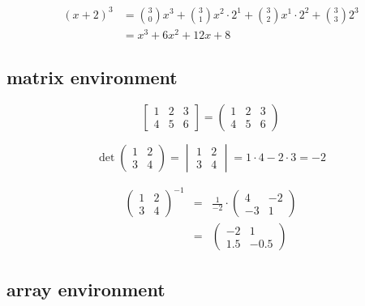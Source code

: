 \documentclass{article}
\begin{document}
\begin{align*}
(x+2)^3 &=\binom{3}{0}x^3+\binom{3}{1}x^2\cdot 2^1+\binom{3}{2}x^1\cdot 2^2+\binom{3}{3} 2^3\\[2mm] %
&= x^3+6x^2+12x+8
\end{align*}

\subsection{matrix environment}

\begin{equation}
\begin{bmatrix} %
1 & 2 & 3\\
4 & 5 & 6
\end{bmatrix}
=
\begin{pmatrix} %
1 & 2 & 3\\
4 & 5 & 6
\end{pmatrix}
\end{equation}

$$
\det 
\begin{pmatrix}
1 & 2\\
3 &4
\end{pmatrix}
=
\begin{vmatrix} %
1 & 2\\
3 &4
\end{vmatrix}
=1\cdot 4-2\cdot 3=-2
$$

\begin{eqnarray}
\begin{pmatrix}
1 & 2\\
3 &4
\end{pmatrix}^{-1}
&=&
\frac{1}{-2}\cdot
\begin{pmatrix}
4 & -2\\
-3 &1
\end{pmatrix} \nonumber \\[2mm]
&=&
\begin{pmatrix}
-2 & 1\\
1.5 &-0.5
\end{pmatrix}
\end{eqnarray}


\subsection{array environment}
\end{document}
